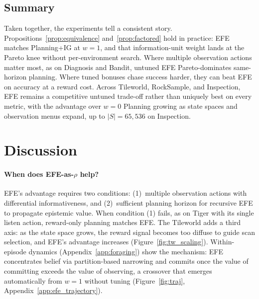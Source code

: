 \documentclass[runningheads]{llncs}
\begin{document}
\subsection{Summary}

Taken together, the experiments tell a consistent story. Propositions~\ref{prop:equivalence} and~\ref{prop:factored} hold in practice: EFE matches Planning+IG at $w{=}1$, and that information-unit weight lands at the Pareto knee without per-environment search. Where multiple observation actions matter most, as on Diagnosis and Bandit, untuned EFE Pareto-dominates same-horizon planning. Where tuned bonuses chase success harder, they can beat EFE on accuracy at a reward cost. Across Tileworld, RockSample, and Inspection, EFE remains a competitive untuned trade-off rather than uniquely best on every metric, with the advantage over $w{=}0$ Planning growing as state spaces and observation menus expand, up to $|S|{=}65{,}536$ on Inspection.

\section{Discussion}
\label{sec:discussion}

\paragraph{When does EFE-as-$\rho$ help?}
EFE's advantage requires two conditions: (1)~multiple observation actions with differential informativeness, and (2)~sufficient planning horizon for recursive EFE to propagate epistemic value. When condition (1) fails, as on Tiger with its single listen action, reward-only planning matches EFE. The Tileworld adds a third axis: as the state space grows, the reward signal becomes too diffuse to guide scan selection, and EFE's advantage increases (Figure~\ref{fig:tw_scaling}). Within-episode dynamics (Appendix~\ref{app:foraging}) show the mechanism: EFE concentrates belief via partition-based narrowing and commits once the value of committing exceeds the value of observing, a crossover that emerges automatically from $w{=}1$ without tuning (Figure~\ref{fig:traj}, Appendix~\ref{app:efe_trajectory}).
\end{document}
